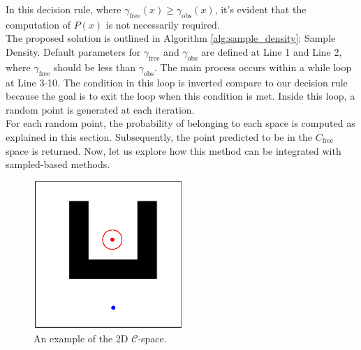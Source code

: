 \documentclass{ctuthesis}
\begin{document}
In this decision rule, where $\gamma_{\text{free}}(x) \geq \gamma_{\text{obs}}(x)$, 
it's evident that the computation of $P(x)$ is not necessarily required.
\\[12pt]
The proposed solution is outlined in Algorithm \ref{alg:sample_density}: Sample Density. 
Default parameters for $\gamma_{\text{free}}$ and $\gamma_{\text{obs}}$ are defined 
at Line 1 and Line 2, 
where $\gamma_{\text{free}}$ should be less than $\gamma_{\text{obs}}$. 
The main process occurs within a while loop at Line 3-10. 
The condition in this loop is inverted compare to our decision rule 
because the goal is to exit the loop when this condition is met. 
Inside this loop, a random point is generated at each iteration. 
\\[12pt]
For each random point, the probability of belonging to each space 
is computed as explained in this section.
Subsequently, the point predicted to be in the $C_{\text{free}}$ space is returned.
Now, let us explore how this method can be integrated with sampled-based methods.


\begin{figure}[!ht]
  \centering 
    \includegraphics[width=0.5\textwidth]{figChap4/SimpleMaze.eps} 
  \caption{An example of the 2D $\mathcal{C}$-space.}
  \label{fig:GKDEmaze}
\end{figure}
\end{document}
